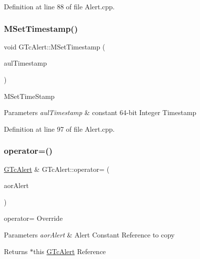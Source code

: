 Definition at line 88 of file Alert.\+cpp.

\mbox{\label{class_g_n_common_1_1_g_tc_alert_aca52809ad95713c5ad550cf5d1fc51fa}} 
\subsubsection{\texorpdfstring{M\+Set\+Timestamp()}{MSetTimestamp()}}
{\footnotesize\ttfamily void G\+Tc\+Alert\+::\+M\+Set\+Timestamp (\begin{DoxyParamCaption}\item[{const \mbox{\hyperlink{namespace_g_n_common_a01e8527dabf7ab4f123156b0701945eb}{G\+Tu64}}}]{aul\+Timestamp }\end{DoxyParamCaption})}

M\+Set\+Time\+Stamp 
\begin{DoxyParams}{Parameters}
{\em aul\+Timestamp} & constant 64-\/bit Integer Timestamp \\
\hline
\end{DoxyParams}


Definition at line 97 of file Alert.\+cpp.

\mbox{\label{class_g_n_common_1_1_g_tc_alert_aba9a3373bd29884b049dfc525f655e5c}} 
\subsubsection{\texorpdfstring{operator=()}{operator=()}}
{\footnotesize\ttfamily \mbox{\hyperlink{class_g_n_common_1_1_g_tc_alert}{G\+Tc\+Alert}} \& G\+Tc\+Alert\+::operator= (\begin{DoxyParamCaption}\item[{const \mbox{\hyperlink{class_g_n_common_1_1_g_tc_alert}{G\+Tc\+Alert}} \&}]{aor\+Alert }\end{DoxyParamCaption})}

operator= Override 
\begin{DoxyParams}{Parameters}
{\em aor\+Alert} & Alert Constant Reference to copy \\
\hline
\end{DoxyParams}
\begin{DoxyReturn}{Returns}
$\ast$this \mbox{\hyperlink{class_g_n_common_1_1_g_tc_alert}{G\+Tc\+Alert}} Reference 
\end{DoxyReturn}


